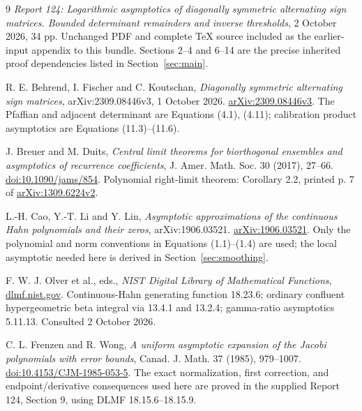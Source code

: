 \begin{thebibliography}{9}
\emph{Report 124: Logarithmic asymptotics of diagonally symmetric
alternating sign matrices. Bounded determinant remainders and inverse
thresholds}, 2 October 2026, 34 pp.
Unchanged PDF and complete TeX source included as the earlier-input
appendix to this bundle. Sections 2--4 and 6--14 are the precise
inherited proof dependencies listed in Section~\ref{sec:main}.

R. E. Behrend, I. Fischer and C. Koutschan,
\emph{Diagonally symmetric alternating sign matrices},
arXiv:2309.08446v3, 1 October 2026.
\href{https://arxiv.org/abs/2309.08446v3}{arXiv:2309.08446v3}.
The Pfaffian and adjacent determinant are Equations (4.1), (4.11);
calibration product asymptotics are Equations (11.3)--(11.6).

J. Breuer and M. Duits,
\emph{Central limit theorems for biorthogonal ensembles and asymptotics
of recurrence coefficients}, J. Amer. Math. Soc. 30 (2017), 27--66.
\href{https://doi.org/10.1090/jams/854}{doi:10.1090/jams/854}.
Polynomial right-limit theorem: Corollary 2.2, printed p. 7 of
\href{https://arxiv.org/pdf/1309.6224v2}{arXiv:1309.6224v2}.

L.-H. Cao, Y.-T. Li and Y. Lin,
\emph{Asymptotic approximations of the continuous Hahn polynomials
and their zeros}, arXiv:1906.03521.
\href{https://arxiv.org/abs/1906.03521}{arXiv:1906.03521}.
Only the polynomial and norm conventions in Equations (1.1)--(1.4)
are used; the local asymptotic needed here is derived in
Section~\ref{sec:smoothing}.

F. W. J. Olver et al., eds., \emph{NIST Digital Library of Mathematical
Functions}, \href{https://dlmf.nist.gov/}{dlmf.nist.gov}.
Continuous-Hahn generating function 18.23.6; ordinary confluent
hypergeometric beta integral via 13.4.1 and 13.2.4; gamma-ratio
asymptotics 5.11.13. Consulted 2 October 2026.

C. L. Frenzen and R. Wong,
\emph{A uniform asymptotic expansion of the Jacobi polynomials with
error bounds}, Canad. J. Math. 37 (1985), 979--1007.
\href{https://doi.org/10.4153/CJM-1985-053-5}{doi:10.4153/CJM-1985-053-5}.
The exact normalization, first correction, and endpoint/derivative
consequences used here are proved in the supplied Report 124,
Section 9, using DLMF 18.15.6--18.15.9.
\end{thebibliography}
